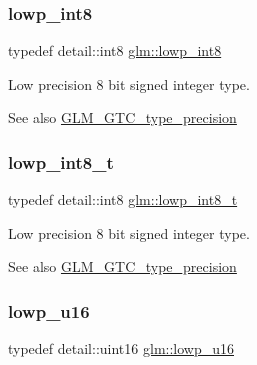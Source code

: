 \subsubsection{\texorpdfstring{lowp\+\_\+int8}{lowp\_int8}}
{\footnotesize\ttfamily typedef detail\+::int8 \hyperlink{group__gtc__type__precision_gaf9e675b6392764242ae87eb179e9d3d6}{glm\+::lowp\+\_\+int8}}

Low precision 8 bit signed integer type. \begin{DoxySeeAlso}{See also}
\hyperlink{group__gtc__type__precision}{G\+L\+M\+\_\+\+G\+T\+C\+\_\+type\+\_\+precision} 
\end{DoxySeeAlso}
\mbox{\label{group__gtc__type__precision_gae6092311f6970a305c2df19a372360a3}} 
\subsubsection{\texorpdfstring{lowp\+\_\+int8\+\_\+t}{lowp\_int8\_t}}
{\footnotesize\ttfamily typedef detail\+::int8 \hyperlink{group__gtc__type__precision_gae6092311f6970a305c2df19a372360a3}{glm\+::lowp\+\_\+int8\+\_\+t}}

Low precision 8 bit signed integer type. \begin{DoxySeeAlso}{See also}
\hyperlink{group__gtc__type__precision}{G\+L\+M\+\_\+\+G\+T\+C\+\_\+type\+\_\+precision} 
\end{DoxySeeAlso}
\mbox{\label{group__gtc__type__precision_ga22c5364f27caa0a6eb0627cbc21e46be}} 
\subsubsection{\texorpdfstring{lowp\+\_\+u16}{lowp\_u16}}
{\footnotesize\ttfamily typedef detail\+::uint16 \hyperlink{group__gtc__type__precision_ga22c5364f27caa0a6eb0627cbc21e46be}{glm\+::lowp\+\_\+u16}}

